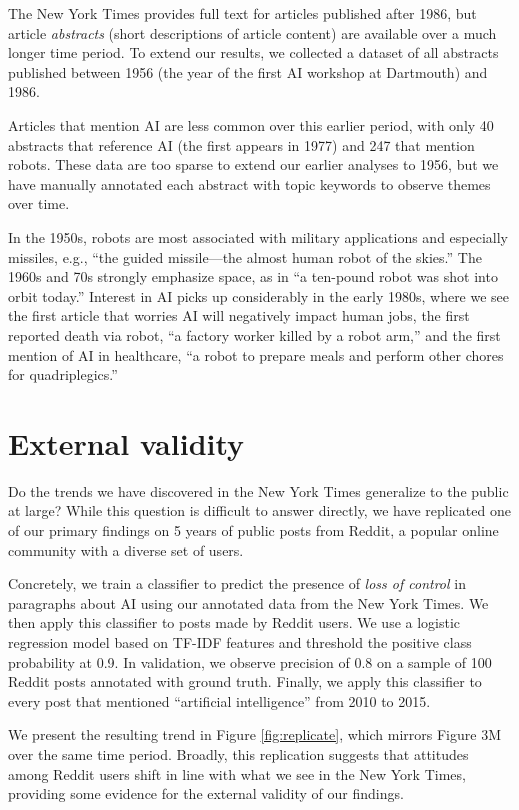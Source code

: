\documentclass[letterpaper]{article}
\begin{document}
The New York Times provides full text for articles published after 1986, but article \textit{abstracts} (short descriptions of article content) are available over a much longer time period. To extend our results, we collected a dataset of all abstracts published between 1956 (the year of the first AI workshop at Dartmouth) and 1986.

Articles that mention AI are less common over this earlier period, with only 40 abstracts that reference AI (the first appears in 1977) and 247 that mention robots. These data are too sparse to extend our earlier analyses to 1956, but we have manually annotated each abstract with topic keywords to observe themes over time.

In the 1950s, robots are most associated with military applications and especially missiles, e.g., ``the guided missile---the almost human robot of the skies.'' The 1960s and 70s strongly emphasize space, as in ``a ten-pound robot was shot into orbit today.'' Interest in AI picks up considerably in the early 1980s, where we see the first article that worries AI will negatively impact human jobs, the first reported death via robot, ``a factory worker killed by a robot arm,'' and the first mention of AI in healthcare, ``a robot to prepare meals and perform other chores for quadriplegics.''

\section{External validity}

Do the trends we have discovered in the New York Times generalize to the public at large? While this question is difficult to answer directly, we have replicated one of our primary findings on 5 years of public posts from Reddit, a popular online community with a diverse set of users.

Concretely, we train a classifier to predict the presence of \textit{loss of control} in paragraphs about AI using our annotated data from the New York Times. We then apply this classifier to posts made by Reddit users. We use a logistic regression model based on TF-IDF features and threshold the positive class probability at 0.9. In validation, we observe precision of 0.8 on a sample of 100 Reddit posts annotated with ground truth. Finally, we apply this classifier to every post that mentioned ``artificial intelligence'' from 2010 to 2015.

We present the resulting trend in Figure \ref{fig:replicate}, which mirrors Figure 3M over the same time period. Broadly, this replication suggests that attitudes among Reddit users shift in line with what we see in the New York Times, providing some evidence for the external validity of our findings.
\end{document}
